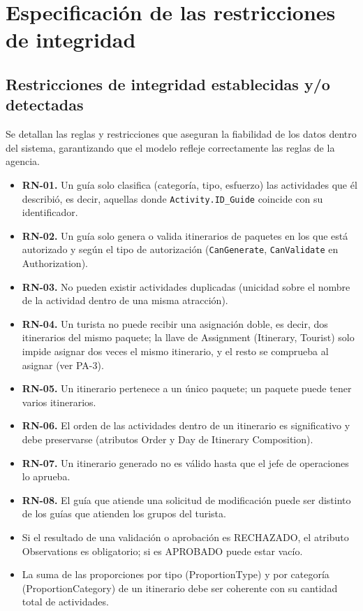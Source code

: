 \documentclass[11pt,a4paper]{article}
\begin{document}
\newpage
\section{Especificación de las restricciones de integridad}
\subsection{Restricciones de integridad establecidas y/o detectadas}
Se detallan las reglas y restricciones que aseguran la fiabilidad de los datos dentro del sistema, garantizando que el modelo refleje correctamente las reglas de la agencia.

\begin{itemize}[leftmargin=1.2em,itemsep=2pt,topsep=3pt]
\item \textbf{RN-01.} Un guía solo clasifica (categoría, tipo, esfuerzo) las actividades que él describió, es decir, aquellas donde \texttt{Activity.ID\_\allowbreak{}Guide} coincide con su identificador.
\item \textbf{RN-02.} Un guía solo genera o valida itinerarios de paquetes en los que está autorizado y según el tipo de autorización (\texttt{CanGenerate}, \texttt{CanValidate} en Authorization).
\item \textbf{RN-03.} No pueden existir actividades duplicadas (unicidad sobre el nombre de la actividad dentro de una misma atracción).
\item \textbf{RN-04.} Un turista no puede recibir una asignación doble, es decir, dos itinerarios del mismo paquete; la llave de Assignment (Itinerary, Tourist) solo impide asignar dos veces el mismo itinerario, y el resto se comprueba al asignar (ver PA-3).
\item \textbf{RN-05.} Un itinerario pertenece a un único paquete; un paquete puede tener varios itinerarios.
\item \textbf{RN-06.} El orden de las actividades dentro de un itinerario es significativo y debe preservarse (atributos Order y Day de Itinerary Composition).
\item \textbf{RN-07.} Un itinerario generado no es válido hasta que el jefe de operaciones lo aprueba.
\item \textbf{RN-08.} El guía que atiende una solicitud de modificación puede ser distinto de los guías que atienden los grupos del turista.
\item Si el resultado de una validación o aprobación es RECHAZADO, el atributo Observations es obligatorio; si es APROBADO puede estar vacío.
\item La suma de las proporciones por tipo (ProportionType) y por categoría (ProportionCategory) de un itinerario debe ser coherente con su cantidad total de actividades.

\end{itemize}
\end{document}

